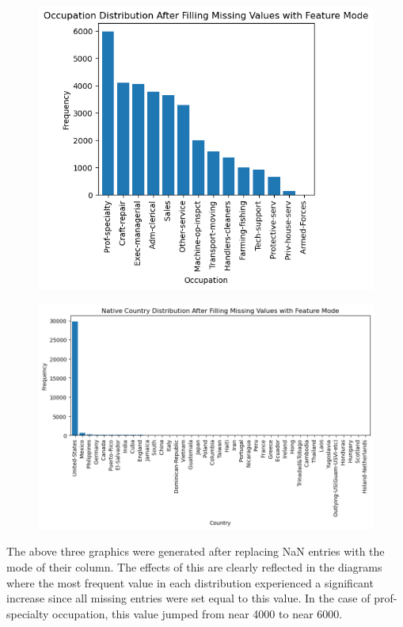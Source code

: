 \documentclass{article}
\begin{document}
    \newpage

    \begin{center}
        \begin{minipage}[t]{0.9\textwidth}
            \begin{figure}[H]
                \centering
                \includegraphics[width=1\textwidth, height=0.4\textheight]{./2_3bii.png}
            \end{figure}
            \begin{figure}[H]
                \centering
                \includegraphics[width=1\textwidth, height=0.4\textheight]{./2_3biii.png}
            \end{figure}
            The above three graphics were generated after replacing NaN entries with the mode
            of their column. The effects of this are clearly reflected in the diagrams where
            the most frequent value in each distribution experienced a significant increase
            since all missing entries were set equal to this value.
            In the case of prof-specialty occupation, this value jumped from near 4000 to near
            6000.
        \end{minipage}
    \end{center}
\end{document}
